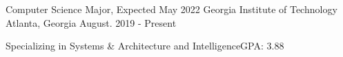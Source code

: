 \begin{cventries}
    
\cventry
    {Computer Science Major, Expected May 2022}
    {Georgia Institute of Technology}
    {Atlanta, Georgia}
    {August. 2019 - Present}
    {
      \begin{cvitems}
        \item {Specializing in Systems \& Architecture and Intelligence{\enskip\cdotp\enskip}GPA: 3.88}
      \end{cvitems}
    }





\end{cventries}
